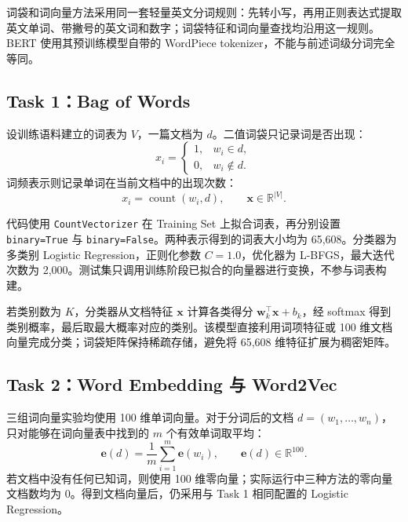 \documentclass[UTF8,a4paper,10pt]{ctexart}
\newcommand{\method}[1]{\texttt{#1}}
\begin{document}
词袋和词向量方法采用同一套轻量英文分词规则：先转小写，再用正则表达式提取英文单词、带撇号的英文词和数字；词袋特征和词向量查找均沿用这一规则。BERT 使用其预训练模型自带的 WordPiece tokenizer，不能与前述词级分词完全等同。

\subsection{Task 1：Bag of Words}

设训练语料建立的词表为 $V$，一篇文档为 $d$。二值词袋只记录词是否出现：
\begin{equation}
  x_i=\begin{cases}
  1, & w_i\in d,\\
  0, & w_i\notin d.
  \end{cases}
\end{equation}
词频表示则记录单词在当前文档中的出现次数：
\begin{equation}
  x_i=\operatorname{count}(w_i,d),\qquad \mathbf{x}\in\mathbb{R}^{|V|}.
\end{equation}

代码使用 \method{CountVectorizer} 在 Training Set 上拟合词表，再分别设置 \method{binary=True} 与 \method{binary=False}。两种表示得到的词表大小均为 65,608。分类器为多类别 Logistic Regression，正则化参数 $C=1.0$，优化器为 L-BFGS，最大迭代次数为 2,000。测试集只调用训练阶段已拟合的向量器进行变换，不参与词表构建。

若类别数为 $K$，分类器从文档特征 $\mathbf{x}$ 计算各类得分 $\mathbf{w}_k^\top\mathbf{x}+b_k$，经 softmax 得到类别概率，最后取最大概率对应的类别。该模型直接利用词项特征或 100 维文档向量完成分类；词袋矩阵保持稀疏存储，避免将 65,608 维特征扩展为稠密矩阵。

\subsection{Task 2：Word Embedding 与 Word2Vec}

三组词向量实验均使用 100 维单词向量。对于分词后的文档 $d=(w_1,\ldots,w_n)$，只对能够在词向量表中找到的 $m$ 个有效单词取平均：
\begin{equation}
  \mathbf{e}(d)=\frac{1}{m}\sum_{i=1}^{m}\mathbf{e}(w_i),
  \qquad \mathbf{e}(d)\in\mathbb{R}^{100}.
\end{equation}
若文档中没有任何已知词，则使用 100 维零向量；实际运行中三种方法的零向量文档数均为 0。得到文档向量后，仍采用与 Task 1 相同配置的 Logistic Regression。
\end{document}
